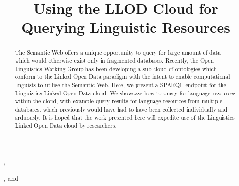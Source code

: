 \documentclass{iosart2c}
\begin{document}
\begin{frontmatter}                           %

\title{Using the LLOD Cloud for Querying Linguistic Resources%
} 



\author[A,B]{ },
\author[C]{ },
and
\author[D]{ }


\address[A]{Department of Intelligent Computer Systems, University of Malta, Msida, MSD2080, Malta}
\address[B]{Computational Linguistics Department, Saarland University, Saarbr\"ucken, 66121, Germany\\  E-mail: littauer@coli.uni-saarland.de}
\address[C]{Research Unit Quantitative Language Comparison, Ludwig Maximilian University, Geschwister Scholl Platz 1, D-80539 Munich, Germany\\ 
E-mail: bambooforest@gmail.com} %
\address[D]{Intelligent Software Components, iSOCO, S.A., Av. del Partenon 16-18, Madrid, Spain\\
E-mail: bvillazon@isoco.com}

\begin{abstract}
The Semantic Web offers a unique opportunity to query for large amount of data which would otherwise exist only in fragmented databases. Recently, the Open Linguistics Working Group has been developing a sub cloud of ontologies which conform to the Linked Open Data paradigm with the intent to enable computational linguists to utilise the Semantic Web. Here, we present a SPARQL endpoint for the Linguistics Linked Open Data cloud. We showcase how to query for language resources within the cloud, with example query results for language resources from multiple databases, which previously would have had to have been collected individually and arduously. It is hoped that the work presented here will expedite use of the Linguistics Linked Open Data cloud by researchers. 


\end{abstract}
\end{frontmatter}
\end{document}
